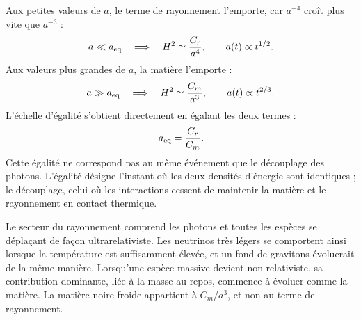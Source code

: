 Aux petites valeurs de \(a\), le terme de rayonnement l’emporte, car \(a^{-4}\) croît plus vite que \(a^{-3}\) :
\begin{equation}
a\ll a_{\rm eq}
\quad\Longrightarrow\quad
H^2\simeq\frac{C_r}{a^4},
\qquad
a(t)\propto t^{1/2}.
\end{equation}
Aux valeurs plus grandes de \(a\), la matière l’emporte :
\begin{equation}
a\gg a_{\rm eq}
\quad\Longrightarrow\quad
H^2\simeq\frac{C_m}{a^3},
\qquad
a(t)\propto t^{2/3}.
\end{equation}
L’échelle d’égalité s’obtient directement en égalant les deux termes :
\begin{equation}
a_{\rm eq}=\frac{C_r}{C_m}.
\label{eq:c02-equality-scale}
\end{equation}
Cette égalité ne correspond pas au même événement que le découplage des photons. L’égalité désigne l’instant où les deux densités d’énergie sont identiques ; le découplage, celui où les interactions cessent de maintenir la matière et le rayonnement en contact thermique.

Le secteur du rayonnement comprend les photons et toutes les espèces se déplaçant de façon ultrarelativiste. Les neutrinos très légers se comportent ainsi lorsque la température est suffisamment élevée, et un fond de gravitons évoluerait de la même manière. Lorsqu’une espèce massive devient non relativiste, sa contribution dominante, liée à la masse au repos, commence à évoluer comme la matière. La matière noire froide appartient à \(C_m/a^3\), et non au terme de rayonnement.

\begin{classroomqa}
\end{classroomqa}

\begin{classroomqa}
\end{classroomqa}

